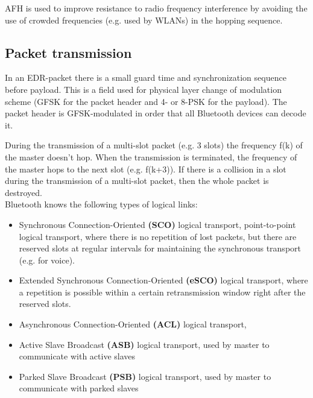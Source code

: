 	AFH is used to improve resistance to radio frequency interference by avoiding the use of crowded frequencies
	(e.g. used by WLANs) in the hopping sequence.

\subsection{Packet transmission}
	In an EDR-packet there is a small guard time and synchronization sequence before payload. This is 
	a field used for physical layer change of modulation scheme (GFSK for the packet header and 4- or 8-PSK 
	for the payload). The packet header is GFSK-modulated in order that all Bluetooth devices can decode it.
	
	During the transmission of a multi-slot packet (e.g. 3 slots) the frequency f(k) of the master doesn't hop. When 
	the transmission is terminated, the frequency of the master hops to the next slot (e.g. f(k+3)). If there is a  
	collision in a slot during the transmission of a multi-slot packet, then the whole packet is destroyed. \\
	
	Bluetooth knows the following types of logical links:
	\begin{itemize}
		\item Synchronous Connection-Oriented \textbf{(SCO)} logical transport, point-to-point logical transport,  
		where there is no repetition of lost packets, but there are reserved slots at regular intervals 
		for maintaining the synchronous transport (e.g. for voice). 
		\item Extended Synchronous Connection-Oriented \textbf{(eSCO)} logical transport, where a repetition is possible 
		within a certain retransmission window right after the reserved slots.
		\item Asynchronous Connection-Oriented \textbf{(ACL)} logical transport, 
		\item Active Slave Broadcast \textbf{(ASB)} logical transport, used by master to communicate with active slaves
		\item Parked Slave Broadcast \textbf{(PSB)} logical transport, used by master to communicate with parked slaves
	\end{itemize}
	
